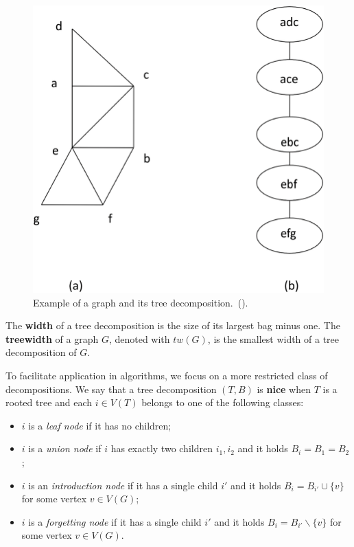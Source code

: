 \begin{figure}[H]
    \centering
    \includegraphics[scale=2]{imgs/decomp1.png}
    \caption{Example of a graph and its tree decomposition.~(\cite{imgTreeDecomp}).}
    \label{fig:decomp1}
\end{figure}

The \textbf{width} of a tree decomposition is the size of its largest bag minus one. The \textbf{treewidth} of a graph \(G\), denoted with \(tw(G)\), is the smallest width of a tree decomposition of \(G\).

To facilitate application in algorithms, we focus on a more restricted class of decompositions. We say that a tree decomposition \((T, B)\) is \textbf{nice} when \(T\) is a rooted tree and each \(i \in V(T)\) belongs to one of the following classes:

\begin{itemize}
    \item \(i\) is a \textit{leaf node} if it has no children;
    \item \(i\) is a \textit{union node} if \(i\) has exactly two children \(i_1, i_2\) and it holds \(B_i = B_1 = B_2\);
    \item \(i\) is an \textit{introduction node} if it has a single child \(i'\) and it holds \(B_i = B_{i'} \cup \{v\}\) for some vertex \(v \in V(G)\);
    \item \(i\) is a \textit{forgetting node} if it has a single child \(i'\) and it holds \(B_i = B_{i'} \backslash \{v\}\) for some vertex \(v \in V(G)\).
\end{itemize}

